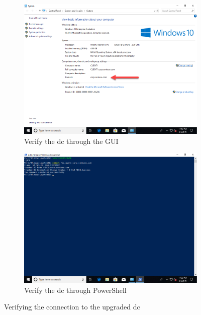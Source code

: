 \begin{figure}[h]\ContinuedFloat
	\begin{subfigure}{0.5\textwidth}
		\captionsetup{width=0.8\linewidth}
		\includegraphics[width=0.9\linewidth]{img/Methodologie/Verification2.png}
		\centering
		\caption{Verify the \acrshort{dc} through the GUI}
	\end{subfigure}
	\begin{subfigure}{0.5\textwidth}
		\captionsetup{width=0.8\linewidth}
		\includegraphics[width=0.9\linewidth]{img/Methodologie/Verification3.png} 
		\centering
		\caption{Verify the \acrshort{dc} through PowerShell}
	\end{subfigure}
	\caption[In-place upgrade verification]{Verifying the connection to the upgraded \acrshort{dc}}
	\label{fig:Verification}
\end{figure}
\clearpage

